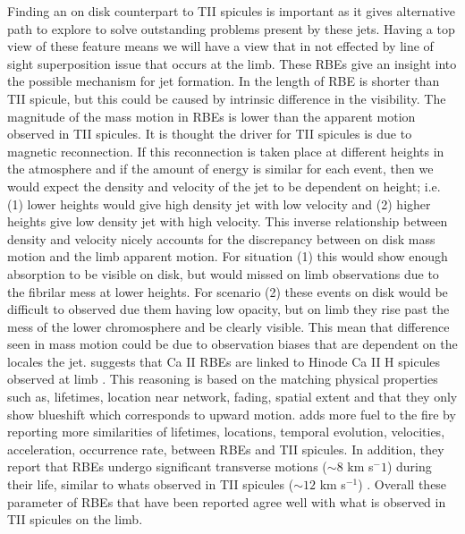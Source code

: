 \documentclass[12pt]{ociamthesis}
\newcommand{\np}{\\ \\}
\begin{document}
Finding an on disk counterpart to TII spicules is important as it gives alternative path to explore to solve outstanding problems present by these jets. Having a top view of these feature means we will have a view that in not effected by line of sight superposition issue that occurs at the limb. These RBEs give an insight into the possible mechanism for jet formation. In \cite{Langangen2008ApJ} the length of RBE is shorter than TII spicule, but this could be caused by intrinsic difference in the visibility. The magnitude of the mass motion in RBEs is lower than the apparent motion observed in TII spicules. It is thought the driver for TII spicules is due to magnetic reconnection. If this reconnection is taken place at different heights in the atmosphere and if the amount of energy is similar for each event, then we would expect the density and velocity of the jet to be dependent on height; i.e. (1) lower heights would give high density jet with low velocity and (2) higher heights give low density jet with high velocity. This inverse relationship between density and velocity nicely accounts for the discrepancy between on disk mass motion and the limb apparent motion. For situation (1) this would show enough absorption to be visible on disk, but would missed on limb observations due to the fibrilar mess at lower heights. For scenario (2) these events on disk would be difficult to observed due them having low opacity, but on limb they rise past the mess of the lower chromosphere and be clearly visible. This mean that difference seen in mass motion could be due to observation biases that are dependent on the locales the jet. \cite{Langangen2008ApJ} suggests that Ca II RBEs are linked to Hinode Ca II H spicules observed at limb \cite{Pontieu2007PASJ}. This reasoning is based on the matching physical properties such as, lifetimes, location near network, fading, spatial extent and that they only show blueshift which corresponds to upward motion. \cite{Rouppe2009ApJ} adds more fuel to the fire by reporting more similarities of lifetimes, locations, temporal evolution, velocities, acceleration, occurrence rate, between RBEs and TII spicules. In addition, they report that RBEs undergo significant transverse motions ($\sim 8$ km s$^-1$) during their life, similar to whats observed in  TII spicules ($\sim 12$ km s$^{-1}$) \cite{De_Pontieu2007}. Overall these parameter of RBEs that have been reported agree well with what is observed in TII spicules on the limb. \np
\end{document}
